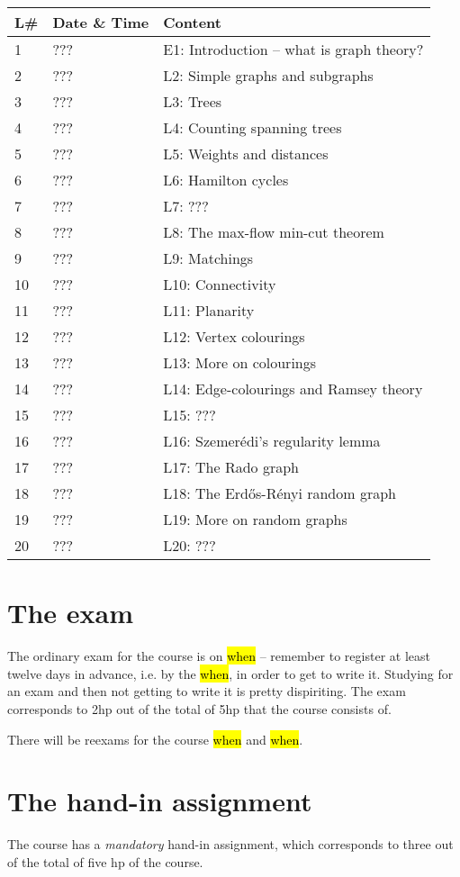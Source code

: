 \documentclass{tufte-handout}
\begin{document}
\begin{table}[h]
\begin{tabularx}{\textwidth}{llX}
L\# & Date \& Time      & Content \\ 
\midrule
1  & ??? & E1: Introduction -- what is graph theory?\\
2  & ??? & L2: Simple graphs and subgraphs\\
3  & ??? & L3: Trees\\
4  & ??? & L4: Counting spanning trees\\
5  & ??? & L5: Weights and distances\\
6  & ??? & L6: Hamilton cycles\\
7  & ??? & L7: ???\\
8  & ??? & L8: The max-flow min-cut theorem\\
9  & ??? & L9: Matchings\\
10 & ??? & L10: Connectivity\\
11 & ??? & L11: Planarity\\
12 & ??? & L12: Vertex colourings\\
13 & ??? & L13: More on colourings\\
14 & ??? & L14: Edge-colourings and Ramsey theory\\
15 & ??? & L15: ???\\
16 & ??? & L16: Szemerédi's regularity lemma\\
17 & ??? & L17: The Rado graph\\
18 & ??? & L18: The Erd\H{o}s-Rényi random graph\\
19 & ??? & L19: More on random graphs\\
20 & ??? & L20: ???
\end{tabularx}
\end{table}

\section{The exam}

The ordinary exam for the course is on \hl{when} -- remember to register at least twelve days in advance, i.e. by the \hl{when}, in order to get to write it. Studying for an exam and then not getting to write it is pretty dispiriting. The exam corresponds to 2hp out of the total of 5hp that the course consists of.

There will be reexams for the course \hl{when} and \hl{when}.

\section{The hand-in assignment}

The course has a \emph{mandatory} hand-in assignment, which corresponds to three out of the total of five hp of the course.



\end{document}
